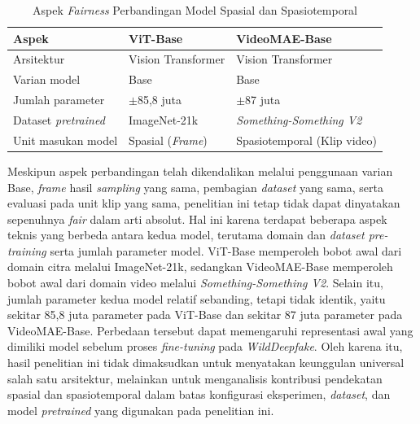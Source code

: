 \begin{table}[H]
\centering
\caption{Aspek \textit{Fairness} Perbandingan Model Spasial dan Spasiotemporal}
\label{tab:3.fairness-model}
\begin{tabular}{lll}
\toprule
\textbf{Aspek} & \textbf{ViT-Base} & \textbf{VideoMAE-Base} \\
\midrule
Arsitektur & Vision Transformer & Vision Transformer \\
Varian model & Base & Base \\
Jumlah parameter & $\pm$85,8 juta & $\pm$87 juta \\
Dataset \textit{pretrained} & ImageNet-21k & \textit{Something-Something V2} \\
Unit masukan model & Spasial (\textit{Frame}) & Spasiotemporal (Klip video) \\
\bottomrule
\end{tabular}
\end{table}
\par

Meskipun aspek perbandingan telah dikendalikan melalui penggunaan varian Base, \textit{frame} hasil \textit{sampling} yang sama, pembagian \textit{dataset} yang sama, serta evaluasi pada unit klip yang sama, penelitian ini tetap tidak dapat dinyatakan sepenuhnya \textit{fair} dalam arti absolut. Hal ini karena terdapat beberapa aspek teknis yang berbeda antara kedua model, terutama domain dan \textit{dataset pre-training} serta jumlah parameter model. ViT-Base memperoleh bobot awal dari domain citra melalui ImageNet-21k, sedangkan VideoMAE-Base memperoleh bobot awal dari domain video melalui \textit{Something-Something V2}. Selain itu, jumlah parameter kedua model relatif sebanding, tetapi tidak identik, yaitu sekitar 85,8 juta parameter pada ViT-Base dan sekitar 87 juta parameter pada VideoMAE-Base. Perbedaan tersebut dapat memengaruhi representasi awal yang dimiliki model sebelum proses \textit{fine-tuning} pada \textit{WildDeepfake}. Oleh karena itu, hasil penelitian ini tidak dimaksudkan untuk menyatakan keunggulan universal salah satu arsitektur, melainkan untuk menganalisis kontribusi pendekatan spasial dan spasiotemporal dalam batas konfigurasi eksperimen, \textit{dataset}, dan model \textit{pretrained} yang digunakan pada penelitian ini. \par

